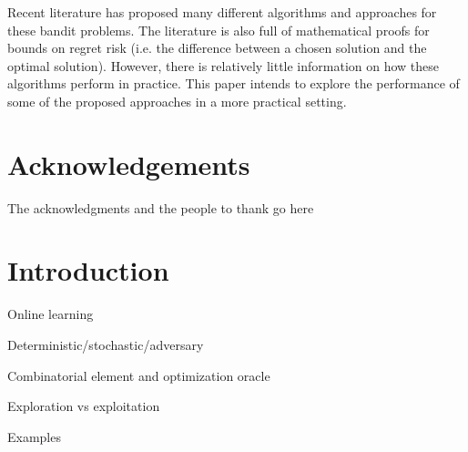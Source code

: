 Recent literature has proposed many different algorithms and approaches for these bandit problems. The literature is also full of mathematical proofs for bounds on regret risk (i.e. the difference between a chosen solution and the optimal solution). However, there is relatively little information on how these algorithms perform in practice. This paper intends to explore the performance of some of the proposed approaches in a more practical setting. 

\pagebreak

\vfill %


\section{Acknowledgements}
The acknowledgments and the people to thank go here

\pagebreak


\tableofcontents %

\pagebreak


\section{Introduction}

Online learning

Deterministic/stochastic/adversary

Combinatorial element and optimization oracle

Exploration vs exploitation

Examples


\pagebreak


